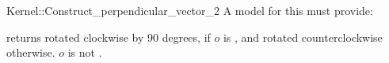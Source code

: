 \begin{ccRefFunctionObjectConcept}{Kernel::Construct_perpendicular_vector_2}
A model for this must provide:


{returns  rotated clockwise by 90 degrees, if $o$ is
, and rotated counterclockwise otherwise.
\ccPrecond $o$ is not .
}

\ccIsModel{}

\end{ccRefFunctionObjectConcept}
